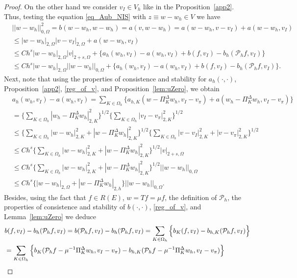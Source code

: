 \documentclass[final,reqno]{elsarticle}
\def\O{\Omega}
\def\PiK{\Pi_{K}^{\Delta}}
\begin{document}
\begin{proof}
On the other hand we consider $v_I\in  V_h  $ like in the Proposition~\ref{app2}. Thus, testing the equation \eqref{eq_Aub_NIS} with $z\equiv w-w_h\in V$ we have
\begin{align}
&||w-w_h||_{0,\O}^2=b(w-w_h,w-w_h)=a(v,w-w_h)=a(w-w_h,v-v_I)+a(w-w_h,v_I)\nonumber\\
&\leq |w-w_h|_{2,\O}|v-v_I|_{2,\O}+ a(w-w_h,v_I)\nonumber\\
&\leq Ch^s|w-w_h|_{2,\O}|v|_{2+s,\O} + \Big\{a_h(w_h,v_I)-a(w_h,v_I)+b(f,v_I)-b_h(\mathcal{P}_hf,v_I)\Big\}\nonumber\\
&\leq Ch^s|w-w_h|_{2,\O}||w-w_h||_{0,\O} + \Big\{a_h(w_h,v_I)-a(w_h,v_I)+b(f,v_I)-b_h(\mathcal{P}_hf,v_I)\Big\}.\label{conv_norL2_1}
\end{align}
Next, note that using the properties of consistence and stability for $a_h(\cdot,\cdot)$, Proposition~\ref{app2}, \eqref{reg_of_v}, and Proposition~\ref{lem:uZero}, we obtain
\begin{align}
&a_h(w_h,v_I)-a(w_h,v_I)=\sum\limits_{K\in \Omega_h} \Big\{ a_{h,K}(w-\PiK w_h,v_I-v_{\pi})+a(w_h-\PiK w_h,v_I-v_\pi)\Big\}\nonumber\\
&=\Big\{\sum\limits_{K\in \Omega_h}|w_h-\PiK w_h|_{2,K}^2 \Big\}^{1/2} \Big\{\sum\limits_{K\in \Omega_h}|v_I - v_\pi|_{2,K}^2 \Big\}^{1/2}\nonumber\\
&\leq \Big\{\sum\limits_{K\in \Omega_h}|w-w_h|_{2,K}^2+|w-\PiK w_h|_{2,K}^2 \Big\}^{1/2} \Big\{\sum\limits_{K\in \Omega_h}|v-v_I|_{2,K}^2+|v - v_\pi|_{2,K}^2 \Big\}^{1/2}\nonumber\\
&\leq Ch^s\Big\{\sum\limits_{K\in \Omega_h}|w-w_h|_{2,K}^2+|w-\PiK w_h|_{2,K}^2 \Big\}^{1/2}|v|_{2+s,\O}\nonumber\\
&\leq Ch^s\Big\{\sum\limits_{K\in \Omega_h}|w-w_h|_{2,K}^2+|w-\PiK w_h|_{2,K}^2\Big\}^{1/2}||w-w_h||_{0,\O}\nonumber\\
&\leq Ch^s\Big\{|w-w_h|_{2,\O}+|w-\PiK w_h|_{2,h}\Big\}||w-w_h||_{0,\O}.\label{conv_norL2_2}
\end{align}
Besides, using the fact that $f\in R(E)$, $w=Tf=\mu f$, the definition of $\mathcal{P}_h$, the properties of consistence and stability of $b(\cdot,\cdot)$, \eqref{reg_of_v}, and  Lemma~\ref{lem:uZero} we deduce
\begin{align}
&b(f,v_I)-b_h(\mathcal{P}_hf,v_I)=b(\mathcal{P}_hf,v_I)-b_h(\mathcal{P}_hf,v_I)=\sum\limits_{K\in \Omega_h} \Big\{b_K(f,v_I) -b_{h,K}(\mathcal{P}_hf,v_I) \Big\}\notag\\
&=\sum\limits_{K\in \Omega_h} \Big\{b_K(\mathcal{P}_hf-\mu^{-1}\PiK w_h,v_I-v_{\pi}) -b_{h,K}(\mathcal{P}_hf-\mu^{-1}\PiK w_h,v_I-v_{\pi}) \Big\} \notag\\

\end{align}
\end{proof}
\end{document}
